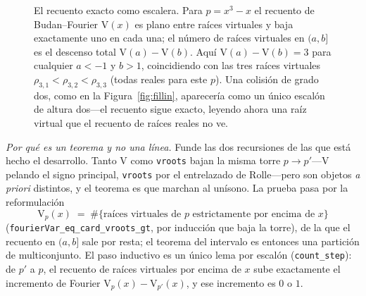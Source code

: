 \documentclass[11pt]{article}
\newcommand{\lean}[1]{\texttt{#1}}
\newcommand{\V}{\mathrm{V}}
\begin{document}
\begin{figure}[t]
\centering
{}
\caption{El recuento exacto como escalera. Para $p=x^3-x$ el recuento de Budan--Fourier $\V(x)$ es plano
entre ra\'ices virtuales y baja exactamente uno en cada una; el n\'umero de ra\'ices virtuales en
$(a,b]$ es el descenso total $\V(a)-\V(b)$. Aqu\'i $\V(a)-\V(b)=3$ para cualquier $a<-1$ y $b>1$,
coincidiendo con las tres ra\'ices virtuales $\rho_{3,1}<\rho_{3,2}<\rho_{3,3}$ (todas reales para este
$p$). Una colisi\'on de grado dos, como en la Figura~\ref{fig:fillin}, aparecer\'ia como un \'unico
escal\'on de altura dos---el recuento sigue exacto, leyendo ahora una ra\'iz virtual que el recuento de
ra\'ices reales no ve.}
\label{fig:staircase}
\end{figure}

\emph{Por qu\'e es un teorema y no una l\'inea.} Funde las dos recursiones de las que est\'a hecho el
desarrollo. Tanto $\V$ como \lean{vroots} bajan la misma torre $p\to p'$---$\V$ pelando el signo
principal, \lean{vroots} por el entrelazado de Rolle---pero son objetos \emph{a priori} distintos, y el
teorema es que marchan al un\'isono. La prueba pasa por la reformulaci\'on
\[
  \V_p(x)\;=\;\#\{\text{ra\'ices virtuales de }p \text{ estrictamente por encima de } x\}
\]
(\lean{fourierVar\_eq\_card\_vroots\_gt}, por inducci\'on que baja la torre), de la que el recuento en
$(a,b]$ sale por resta; el teorema del intervalo es entonces una partici\'on de multiconjunto. El paso
inductivo es un \'unico lema por escal\'on (\lean{count\_step}): de $p'$ a $p$, el recuento de ra\'ices
virtuales por encima de $x$ sube exactamente el incremento de Fourier $\V_p(x)-\V_{p'}(x)$, y ese
incremento es $0$ o $1$.
\end{document}
